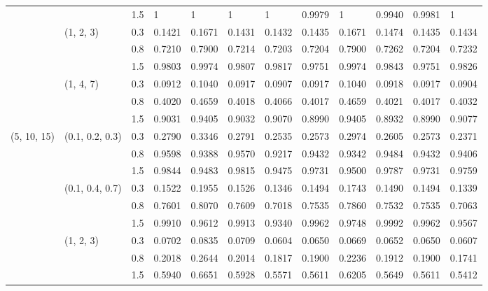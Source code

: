 \begin{table}[h]
\begin{tabular}{llllllllllll}
             		&                 	& 1.5 	& 1 		& 1		& 1	 	& 1	 	& 0.9979 	& 1	 	& 0.9940  & 0.9981 	& 1	       \\
             		& (1, 2, 3)       	& 0.3 	& 0.1421 	& 0.1671 	& 0.1431 	& 0.1432 	& 0.1435 	& 0.1671 	& 0.1474 	& 0.1435 	& 0.1434 \\
             		&                 	& 0.8 	& 0.7210 	& 0.7900  	& 0.7214 	& 0.7203 	& 0.7204 	& 0.7900  	& 0.7262 	& 0.7204 	& 0.7232 \\
           		&                 	& 1.5 	& 0.9803 	& 0.9974 	& 0.9807 	& 0.9817 	& 0.9751 	& 0.9974 	& 0.9843 	& 0.9751 	& 0.9826 \\
          		& (1, 4, 7)       	& 0.3 	& 0.0912 	& 0.1040  	& 0.0917 	& 0.0907 	& 0.0917 	& 0.1040  	& 0.0918 	& 0.0917 	& 0.0904 \\
             		&                 	& 0.8 	& 0.4020 	& 0.4659 	& 0.4018 	& 0.4066 	& 0.4017 	& 0.4659 	& 0.4021 	& 0.4017 	& 0.4032 \\
             		&                 	& 1.5 	& 0.9031 	& 0.9405 	& 0.9032 	& 0.9070  	& 0.8990 	& 0.9405 	& 0.8932 	& 0.8990 	& 0.9077 \\\hline
(5, 10, 15)  	& (0.1, 0.2, 0.3) & 0.3 	& 0.2790 	& 0.3346 	& 0.2791 	& 0.2535 	& 0.2573 	& 0.2974 	& 0.2605 	& 0.2573 	& 0.2371 \\
            		&                 	& 0.8 	& 0.9598 	& 0.9388 	& 0.9570  	& 0.9217 	& 0.9432 	& 0.9342 	& 0.9484 	& 0.9432 	& 0.9406 \\
             		&                 	& 1.5 	& 0.9844 	& 0.9483 	& 0.9815 	& 0.9475 	& 0.9731 	& 0.9500 	& 0.9787 	& 0.9731 	& 0.9759 \\
             		& (0.1, 0.4, 0.7) & 0.3 	& 0.1522 	& 0.1955 	& 0.1526 	& 0.1346 	& 0.1494 	& 0.1743 	& 0.1490  	& 0.1494 	& 0.1339 \\
             		&                 	& 0.8 	& 0.7601 	& 0.8070  	& 0.7609 	& 0.7018 	& 0.7535 	& 0.7860  	& 0.7532 	& 0.7535 	& 0.7063 \\
             		&                 	& 1.5 	& 0.9910 	& 0.9612 	& 0.9913 	& 0.9340 	& 0.9962 	& 0.9748 	& 0.9992	& 0.9962 	& 0.9567 \\
             		& (1, 2, 3)       	& 0.3 	& 0.0702 	& 0.0835 	& 0.0709 	& 0.0604 	& 0.0650 	& 0.0669 	& 0.0652 	& 0.0650 	& 0.0607 \\
             		&                 	& 0.8 	& 0.2018 	& 0.2644 	& 0.2014 	& 0.1817 	& 0.1900  	& 0.2236 	& 0.1912 	& 0.1900  	& 0.1741 \\
             		&                 	& 1.5 	& 0.5940 	& 0.6651 	& 0.5928 	& 0.5571 	& 0.5611 	& 0.6205 	& 0.5649 	& 0.5611 	& 0.5412 \\

\end{tabular}
\end{table}
